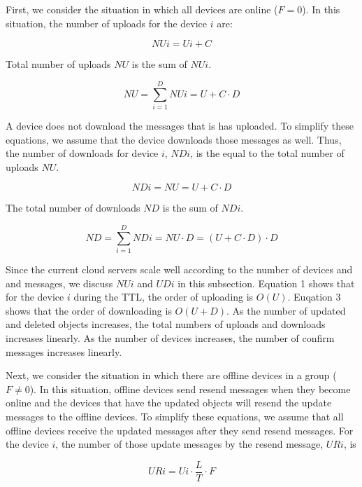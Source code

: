 \documentclass[sigconf]{acmart}
\begin{document}
First, we consider the situation in which all devices are online ($F=0$).
In this situation, the number of uploads for the device $i$ are:

\begin{equation}
NUi = Ui + C
\end{equation}

Total number of uploads $NU$ is the sum of $NUi$.

\begin{equation}
NU = \sum_{i = 1}^{D} NUi = U + C \cdot D
\end{equation}

A device does not download the messages that is has uploaded.
To simplify these equations, we assume that the device downloads those messages as well.
Thus, the number of downloads for device $i$, $NDi$, is the equal to the total number of uploads $NU$.

\begin{equation}
NDi = NU = U + C \cdot D
\end{equation}

The total number of downloads $ND$ is the sum of $NDi$.

\begin{equation}
ND = \sum_{i = 1}^{D} NDi = NU \cdot D =  (U + C \cdot D) \cdot D
\end{equation}

Since the current cloud servers scale well according to the number of devices and and messages, we discuss $NUi$ and $UDi$ in this subsection.
Equation 1 shows that for the device $i$ during the TTL, the order of uploading is $O(U)$.
Euqation 3 shows that the order of downloading is $O(U+D)$.
As the number of updated and deleted objects increases, the total numbers of uploads and downloads increases linearly.
As the number of devices increases, the number of confirm messages increases linearly.

Next, we consider the situation in which there are offline devices in a group ($F \neq 0$).
In this situation, offline devices send resend messages when they become online and the devices that have the updated objects will resend the update messages to the offline devices.
To simplify these equations, we assume that all offline devices receive the updated messages after they send resend messages.
For the device $i$, the number of those update messages by the resend message, $URi$, is

\begin{equation}
URi = Ui \cdot \frac{L}{T} \cdot F
\end{equation}
\end{document}
